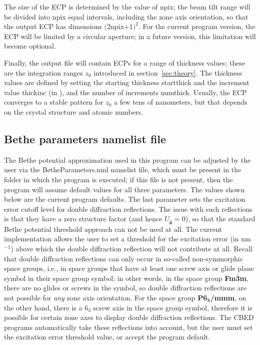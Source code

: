 \documentclass[DIV=calc, paper=letter, fontsize=11pt]{scrartcl}	 %
\begin{document}
The size of the ECP is determined by the value of \textsf{npix}; the beam tilt range will be divided into \textsf{npix} equal intervals, including 
the zone axis orientation, so that the output ECP has dimensions $(2$\textsf{npix}$+1)^2$.  For the current program version, the ECP will be 
limited by a circular aperture; in a future version, this limitation will become optional.

Finally, the output file will contain ECPs for a range of thickness values; these are the integration ranges $z_0$
introduced in section~\ref{sec:theory}.  The thickness values are defined by setting the starting thickness \textsf{startthick} and
the increment value \textsf{thickinc} (in \nano\meter), and the number of increments \textsf{numthick}.  Usually, the ECP converges 
to a stable pattern for $z_0$ a few tens of nanometers, but that depends on the crystal structure and atomic numbers.


\subsection{Bethe parameters namelist file\label{sec:f90BetheParameters}}
The Bethe potential approximation used in this program can be adjusted by the
user via the \textsf{BetheParameters.nml} namelist file, which must be present 
in the folder in which the program is executed; if this file is not present, then the
program will assume default values for all three parameters.  The values shown below
are the current program defaults.
The last parameter sets the excitation error cutoff level for double diffraction reflections.  The issue with
such reflections is that they have a zero structure factor (and hence $U_{\mathbf{g}} = 0$), so that 
the standard Bethe potential threshold approach can not be used at all.  The current implementation
allows the user to set a threshold for the excitation error (in nm$^{-1}$) above which the double diffraction reflection
will not contribute at all.  Recall that double diffraction reflections can only occur in so-called non-symmorphic 
space groups, i.e., in space groups that have at least one screw axis or glide plane symbol in their space 
group symbol; in other words, in the space group \textbf{Fm$\bar{\mathbf{3}}$m}, there are no glides or screws in
the symbol, so double diffraction reflections are not possible for \textit{any} zone axis orientation.  For the space group \textbf{P6$_{\mathbf{3}}$/mmm},
on the other hand, there is a $6_3$ screw axis in the space group symbol, therefore it is possible for certain
zone axes to display double diffraction reflections.  The CBED programs automatically take these reflections into account, but the user must
set the excitation error threshold value, or accept the program default.
\end{document}
